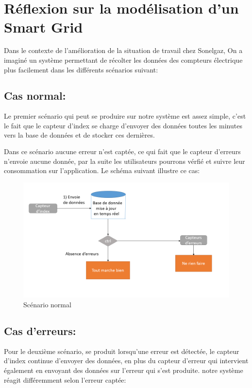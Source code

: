\section{Réflexion sur la modélisation d'un Smart Grid}
Dans le contexte de l'amélioration de la situation de travail chez Sonelgaz, On a imaginé un système permettant de récolter les données des compteurs électrique plus facilement dans les différents scénarios suivant:

\subsection{Cas normal:}
Le premier scénario qui peut se produire sur notre système est assez simple, c'est le fait que le capteur d'index se charge d'envoyer des données toutes les minutes vers la base de données et de stocker ces dernières.

Dans ce scénario aucune erreur n'est captée, ce qui fait que le capteur d'erreurs n'envoie aucune donnée, par la suite les utilisateurs pourrons vérfié et suivre leur consommation sur l'application. Le schéma suivant illustre ce cas:

\begin{figure}[h]
	\centering
	\includegraphics[scale=0.6]{img/part2/2.1.png}
	\caption{Scénario normal}
\end{figure}

\newpage

\subsection{Cas d'erreurs:}
Pour le deuxième scénario, se produit lorsqu'une erreur est détectée, le capteur d'index continue d'envoyer des données, en plus du capteur d'erreur qui intervient également en envoyant des données sur l'erreur qui s'est produite. notre système réagit différemment selon l'erreur captée:

